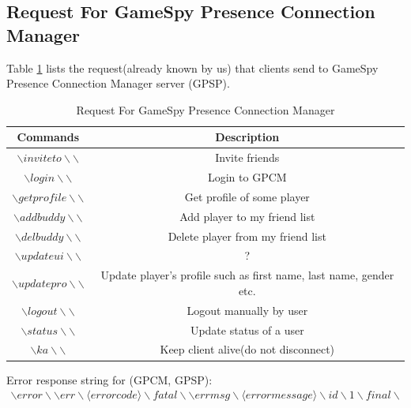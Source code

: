 \documentclass[oneside,titlepage,a4paper]{Definition/retrospy} %
\begin{document}
\subsection{Request For GameSpy Presence Connection Manager}
Table \ref{Request For GameSpy Presence Connection Manager} lists the request(already known by us) that clients send to GameSpy Presence Connection Manager server (GPSP).
\begin{table}[H]
	\centering
	\begin{tabular}{|c|c|}
		\hline 
		\textbf{Commands}&\textbf{Description}  \\ 
		\hline 
		$\backslash inviteto \backslash\backslash$& Invite friends\\ 		
		\hline 
		$\backslash login \backslash\backslash$&Login to GPCM \\
		\hline
 		$\backslash getprofile \backslash\backslash$&	Get profile of some player\\
 		\hline
		$\backslash addbuddy \backslash\backslash$& Add player to my friend list \\
		\hline
		$\backslash delbuddy \backslash\backslash$ & Delete player from my friend list \\
		\hline
		$\backslash updateui \backslash\backslash$& ?\\
		\hline
		$\backslash updatepro \backslash\backslash$& Update player's profile such as first name, last name, gender etc. \\
		\hline
		$\backslash logout \backslash\backslash$& Logout manually by user\\
		\hline
		$\backslash status \backslash\backslash$& Update status of a user\\
		\hline
		$\backslash ka \backslash\backslash$& Keep client alive(do not disconnect) \\
 		
		\hline 
	\end{tabular} 
	\caption{Request For GameSpy Presence Connection Manager}
	\label{Request For GameSpy Presence Connection Manager}
\end{table}

Error response string for (GPCM, GPSP):
\begin{equation}
\begin{split}
\backslash error \backslash\backslash err \backslash \langle error code \rangle \backslash fatal\backslash\backslash errmsg \backslash \langle error message \rangle \backslash id\backslash 1 \backslash final \backslash
\end{split}	
\end{equation}
\end{document}
